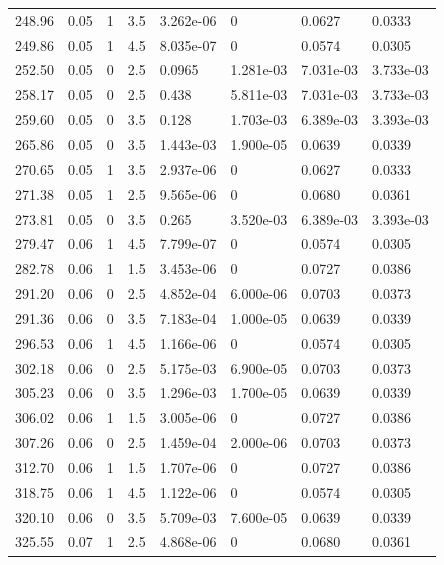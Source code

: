 \documentclass[preview]{standalone}
\begin{document}
{{{\begin{tabular}{L{1.2cm}C{1.2cm} C{0.3cm}C{0.5cm} C{1.4cm}C{1.4cm} C{1.4cm}C{1.4cm}}
  248.96  &  0.05  & 1     & 3.5 &  3.262e-06  & 0  & 0.0627 &  0.0333   \\ 
  249.86  &  0.05  & 1     & 4.5 &  8.035e-07  & 0  & 0.0574 &  0.0305   \\ 
  252.50  &  0.05  & 0     & 2.5 &  0.0965  & 1.281e-03  & 7.031e-03 &  3.733e-03   \\ 
  258.17  &  0.05  & 0     & 2.5 &  0.438  & 5.811e-03  & 7.031e-03 &  3.733e-03   \\ 
  259.60  &  0.05  & 0     & 3.5 &  0.128  & 1.703e-03  & 6.389e-03 &  3.393e-03   \\ 
  265.86  &  0.05  & 0     & 3.5 &  1.443e-03  & 1.900e-05  & 0.0639 &  0.0339   \\ 
  270.65  &  0.05  & 1     & 3.5 &  2.937e-06  & 0  & 0.0627 &  0.0333   \\ 
  271.38  &  0.05  & 1     & 2.5 &  9.565e-06  & 0  & 0.0680 &  0.0361   \\ 
  273.81  &  0.05  & 0     & 3.5 &  0.265  & 3.520e-03  & 6.389e-03 &  3.393e-03   \\ 
  279.47  &  0.06  & 1     & 4.5 &  7.799e-07  & 0  & 0.0574 &  0.0305   \\ 
  282.78  &  0.06  & 1     & 1.5 &  3.453e-06  & 0  & 0.0727 &  0.0386   \\ 
  291.20  &  0.06  & 0     & 2.5 &  4.852e-04  & 6.000e-06  & 0.0703 &  0.0373   \\ 
  291.36  &  0.06  & 0     & 3.5 &  7.183e-04  & 1.000e-05  & 0.0639 &  0.0339   \\ 
  296.53  &  0.06  & 1     & 4.5 &  1.166e-06  & 0  & 0.0574 &  0.0305   \\ 
  302.18  &  0.06  & 0     & 2.5 &  5.175e-03  & 6.900e-05  & 0.0703 &  0.0373   \\ 
  305.23  &  0.06  & 0     & 3.5 &  1.296e-03  & 1.700e-05  & 0.0639 &  0.0339   \\ 
  306.02  &  0.06  & 1     & 1.5 &  3.005e-06  & 0  & 0.0727 &  0.0386   \\ 
  307.26  &  0.06  & 0     & 2.5 &  1.459e-04  & 2.000e-06  & 0.0703 &  0.0373   \\ 
  312.70  &  0.06  & 1     & 1.5 &  1.707e-06  & 0  & 0.0727 &  0.0386   \\ 
  318.75  &  0.06  & 1     & 4.5 &  1.122e-06  & 0  & 0.0574 &  0.0305   \\ 
  320.10  &  0.06  & 0     & 3.5 &  5.709e-03  & 7.600e-05  & 0.0639 &  0.0339   \\ 
  325.55  &  0.07  & 1     & 2.5 &  4.868e-06  & 0  & 0.0680 &  0.0361   \\ 

\end{tabular}}}}
\end{document}

